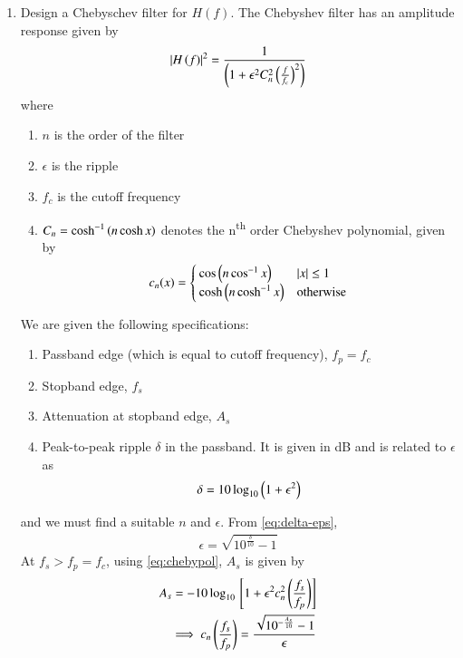 \documentclass[journal,12pt,twocolumn]{IEEEtran}
\renewcommand\thesection{\arabic{section}}
\begin{document}
\begin{enumerate}[label=\thesection.\arabic*
,ref=\thesection.\theenumi]
\item Design a Chebyschev filter for $H(f)$.
\solution The Chebyshev filter has an amplitude response
given by
\begin{align}
    \left\vert H\left(f\right)\right\vert^2 = \frac{1}{\left(1 + \epsilon^2C_n^2\left(\frac{f}{f_c}\right)^2\right)}
\end{align}
where 
\begin{enumerate}
    \item $n$ is the order of the filter
    \item $\epsilon$ is the ripple
    \item $f_c$ is the cutoff frequency 
    \item $C_n = \cosh^{-1}\left(n\cosh{x}\right)$ denotes 
    the n\textsuperscript{th} order Chebyshev polynomial,
    given by
    \begin{align}
        c_n(x) =
        \begin{cases}
            \cos\left(n\cos^{-1}x\right) & \left\vert x\right\vert \le 1 \\
            \cosh\left(n\cosh^{-1}x\right) & \textrm{otherwise}
        \end{cases}
        \label{eq:chebypol}
    \end{align}
\end{enumerate}
We are given the following specifications:
\begin{enumerate}
    \item Passband edge (which is equal to 
    cutoff frequency), $f_p = f_c$
    \item Stopband edge, $f_s$
    \item Attenuation at stopband edge, $A_s$
    \item Peak-to-peak ripple $\delta$ in the passband.
    It is given in dB and is related to $\epsilon$ as
    \begin{align}
        \delta = 10\log_{10}\left(1 + \epsilon^2\right)
        \label{eq:delta-eps}
    \end{align}
\end{enumerate}
and we must find a suitable $n$ and $\epsilon$. From
\eqref{eq:delta-eps},
\begin{align}
    \epsilon = \sqrt{10^{\frac{\delta}{10}} - 1}
    \label{eq:epsilon-del}
\end{align}
At $f_s > f_p = f_c$, using \eqref{eq:chebypol}, $A_s$ is given by
\begin{align}
    A_s = -10\log_{10}\sbrak{1 + \epsilon^2c_n^2\brak{\frac{f_s}{f_p}}} \\
    \implies c_n\brak{\frac{f_s}{f_p}} = \frac{\sqrt{10^{-\frac{A_s}{10}} - 1}}{\epsilon} \\

\end{align}
\end{enumerate}
\end{document}
